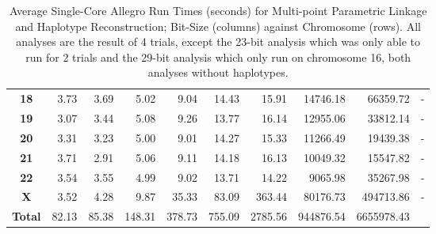 \begin{table}[h]
\begin{center}
{\begin{tabular}{crrrrrrrrr}
\textbf{18}                        & 3.73                           & 3.69                           & 5.02                           & 9.04                           & 14.43                           & 15.91                           & 14746.18                        & 66359.72                         & -                                \\
\textbf{19}                        & 3.07                           & 3.44                           & 5.08                           & 9.26                           & 13.77                           & 16.14                           & 12955.06                        & 33812.14                         & -                                \\
\textbf{20}                        & 3.31                           & 3.23                           & 5.00                           & 9.01                           & 14.27                           & 15.33                           & 11266.49                        & 19439.38                         & -                                \\
\textbf{21}                        & 3.71                           & 2.91                           & 5.06                           & 9.11                           & 14.18                           & 16.13                           & 10049.32                        & 15547.82                         & -                                \\
\textbf{22}                        & 3.54                           & 3.55                           & 4.99                           & 9.02                             & 13.71                           & 14.22                           & 9065.98                         & 35267.98                         & -                                \\
\textbf{X}                         & 3.52                           & 4.28                            & 9.87                           & 35.33                          & 83.09                           & 363.44                          & 80176.73                        & 494713.86                        & -                               \\\hline
\textbf{Total}	& 82.13		& 85.38		& 148.31		& 	378.73 & 	755.09 &  2785.56    & 944876.54 & 6655978.43 \\
\end{tabular}
}
\end{center}
\vspace{-15pt}
\caption[Average Single-Core Allegro Run Times for MPT and Haplotype Reconstruction]{Average Single-Core Allegro Run Times (seconds) for Multi-point Parametric Linkage and Haplotype Reconstruction; Bit-Size (columns) against Chromosome (rows). All analyses are the result of 4 trials, except the 23-bit analysis which was only able to run for 2 trials and the 29-bit analysis which only run on chromosome 16, both analyses without haplotypes.}\label{table:res:allegrosinglechroms}
\end{table}


